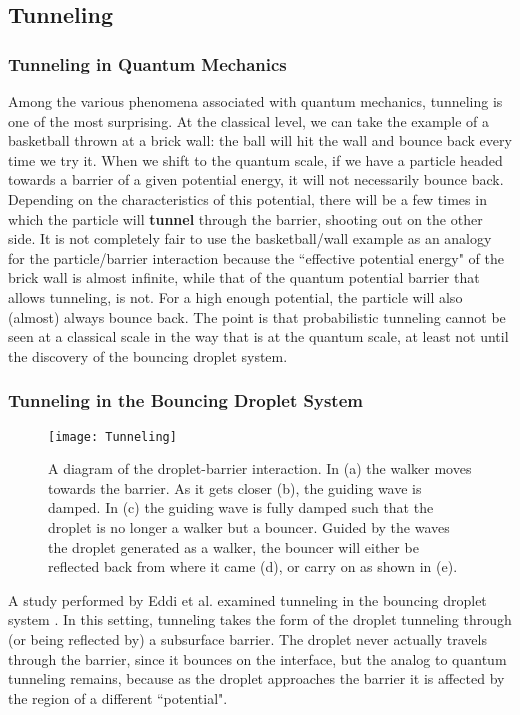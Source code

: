 \subsection{Tunneling}
\label{sect:tunneling}

    \subsubsection{Tunneling in Quantum Mechanics}
    
Among the various phenomena associated with quantum mechanics, tunneling is one of the most surprising. At the classical level, we can take the example of a basketball thrown at a brick wall: the ball will hit the wall and bounce back every time we try it. When we shift to the quantum scale, if we have a particle headed towards a barrier of a given potential energy, it will not necessarily bounce back. Depending on the characteristics of this potential, there will be a few times in which the particle will \textbf{tunnel} through the barrier, shooting out on the other side. It is not completely fair to use the basketball/wall example as an analogy for the particle/barrier interaction because the ``effective potential energy" of the brick wall is almost infinite, while that of the quantum potential barrier that allows tunneling, is not. For a high enough potential, the particle will also (almost) always bounce back. The point is that probabilistic tunneling cannot be seen at a classical scale in the way that is at the quantum scale, at least not until the discovery of the bouncing droplet system.

    \subsubsection{Tunneling in the Bouncing Droplet System}

\begin{figure}[h!]
 \centering
	    \texttt{[image: Tunneling]}
	     \caption{A diagram of the droplet-barrier interaction. In (a) the walker moves towards the barrier. As it gets closer (b), the guiding wave is damped. In (c) the guiding wave is fully damped such that the droplet is no longer a walker but a bouncer. Guided by the waves the droplet generated as a walker, the bouncer will either be reflected back from where it came (d), or carry on as shown in (e).}
	 \label{tuncartoon}
	\end{figure}
	A study performed by Eddi et al. examined tunneling in the bouncing droplet system \cite{tunneling}. In this setting, tunneling takes the form of the droplet tunneling through (or being reflected by) a subsurface barrier. The droplet never actually travels through the barrier, since it bounces on the interface, but the analog to quantum tunneling remains, because as the droplet approaches the barrier it is affected by the region of a different ``potential". 
	
